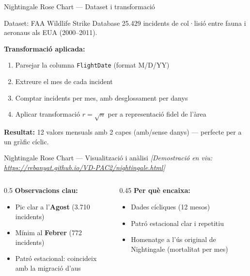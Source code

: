 \documentclass[aspectratio=169, 11pt]{beamer}
\begin{document}
\begin{frame}{Nightingale Rose Chart --- Dataset i transformació}
\begin{block}{Dataset: FAA Wildlife Strike Database}
    25.429 incidents de col·lisió entre fauna i aeronaus als EUA (2000--2011).
\end{block}

\vspace{0.8em}

\textbf{Transformació aplicada:}
\begin{enumerate}
    \item Parsejar la columna \texttt{FlightDate} (format M/D/YY)
    \item Extreure el mes de cada incident
    \item Comptar incidents per mes, amb desglossament per danys
    \item Aplicar transformació $r = \sqrt{n}$ per a representació fidel de l'àrea
\end{enumerate}

\vspace{0.5em}
\small
\textbf{Resultat:} 12 valors mensuals amb 2 capes (amb/sense danys) --- perfecte per a un gràfic cíclic.
\end{frame}

\begin{frame}{Nightingale Rose Chart --- Visualització i anàlisi}
\centering
\textit{[Demostració en viu: \url{https://rebanyat.github.io/VD-PAC2/nightingale.html}]}

\vspace{1.5em}

\begin{columns}
\begin{column}{0.5\textwidth}
\textbf{Observacions clau:}
\begin{itemize}
    \item Pic clar a l'\textbf{Agost} (3.710 incidents)
    \item Mínim al \textbf{Febrer} (772 incidents)
    \item Patró estacional: coincideix amb la migració d'aus
\end{itemize}
\end{column}
\begin{column}{0.45\textwidth}
\textbf{Per què encaixa:}
\begin{itemize}
    \item Dades cícliques (12 mesos)
    \item Patró estacional clar i repetitiu
    \item Homenatge a l'ús original de Nightingale (mortalitat per mes)
\end{itemize}
\end{column}
\end{columns}
\end{frame}
\end{document}
